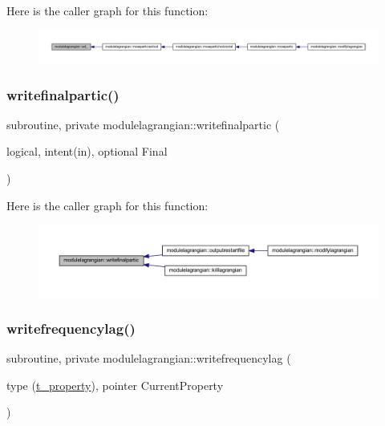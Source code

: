 Here is the caller graph for this function\+:\nopagebreak
\begin{figure}[H]
\begin{center}
\leavevmode
\includegraphics[width=350pt]{namespacemodulelagrangian_a017fc1ab12cc04b5c4839d5ea0b54365_icgraph}
\end{center}
\end{figure}
\mbox{\label{namespacemodulelagrangian_a5d2088faec6c07d9907d57eacfc167ae}} 
\subsubsection{\texorpdfstring{writefinalpartic()}{writefinalpartic()}}
{\footnotesize\ttfamily subroutine, private modulelagrangian\+::writefinalpartic (\begin{DoxyParamCaption}\item[{logical, intent(in), optional}]{Final }\end{DoxyParamCaption})\hspace{0.3cm}{\ttfamily [private]}}

Here is the caller graph for this function\+:\nopagebreak
\begin{figure}[H]
\begin{center}
\leavevmode
\includegraphics[width=350pt]{namespacemodulelagrangian_a5d2088faec6c07d9907d57eacfc167ae_icgraph}
\end{center}
\end{figure}
\mbox{\label{namespacemodulelagrangian_a73f212ed028e8e36231a715754b12d20}} 
\subsubsection{\texorpdfstring{writefrequencylag()}{writefrequencylag()}}
{\footnotesize\ttfamily subroutine, private modulelagrangian\+::writefrequencylag (\begin{DoxyParamCaption}\item[{type (\mbox{\hyperlink{structmodulelagrangian_1_1t__property}{t\+\_\+property}}), pointer}]{Current\+Property }\end{DoxyParamCaption})\hspace{0.3cm}{\ttfamily [private]}}

